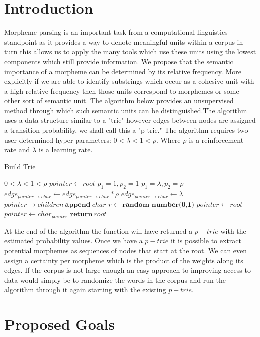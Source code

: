 \documentclass[11pt,a4paper]{article}
\begin{document}
\section{Introduction}
Morpheme parsing is an important task from a computational linguistics 
standpoint as it provides a way to denote meaningful units within a corpus
in turn this allows us to apply the many tools which use these units using the
lowest components which still provide information. We propose that the 
semantic importance of a morpheme can be determined by its relative frequency.
More explicitly if we are able to identify substrings which occur as a 
cohesive unit with a high relative frequency then those units correspond to 
morphemes or some other sort of semantic unit. The algorithm below provides
an unsupervised method through which such semantic units can be distinguished.The algorithm uses a data structure similar to a "trie" however edges between 
nodes are assigned a transition probability, we shall call this a "p-trie." 
The algorithm requires two user determined hyper parameters: 
$0 < \lambda < 1 < \rho$. Where $\rho$ is a reinforcement rate and 
$\lambda$ is a learning rate.
\begin{algorithm}
\caption{Build Trie}
\begin{algorithmic}
\REQUIRE $0 < \lambda < 1 < \rho$
\STATE $pointer \leftarrow root$
\STATE $p_1 = 1,p_2=1$
\ELSE
\STATE $p_1 = \lambda, p_2 = \rho$
\ENDIF
{}
\STATE $edge_{pointer\to char} \leftarrow edge_{pointer\to char} * \rho$
\ELSE
\STATE $edge_{pointer\to char} \leftarrow \lambda$
\STATE $pointer\to children\ \textbf{append}\ char$
\ENDIF
\STATE $r \leftarrow \textbf{random number(0,1)}$
\STATE $pointer \leftarrow root$
\ELSE
\STATE $pointer \leftarrow char_{pointer}$
\ENDIF
\ENDFOR
\STATE $\textbf{return}\ root$
\end{algorithmic}
\end{algorithm}
At the end of the algorithm the function will have returned a $p-trie$ with
the estimated probability values. Once we have a $p-trie$ it is possible to
extract potential morphemes as sequences of nodes that start at the root. We
can even assign a certainty per morpheme which is the product of the weights 
along its edges. If the corpus is not large enough an easy approach to 
improving access to data would simply be to randomize the words in the corpus
and run the algorithm through it again starting with the existing $p-trie$.
\section{Proposed Goals}
\end{document}
